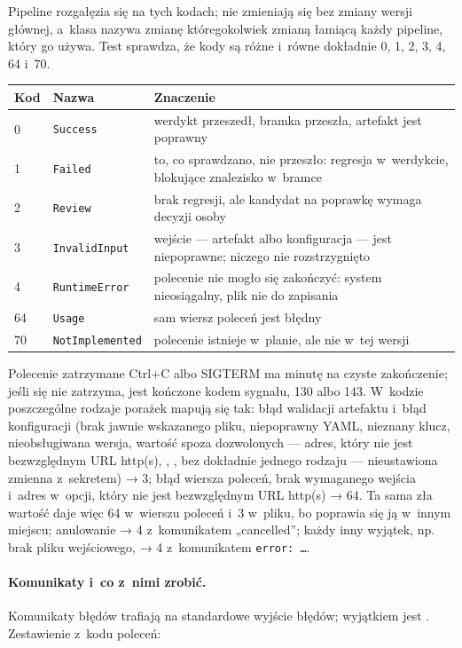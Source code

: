 Pipeline rozgałęzia się na tych kodach; nie zmieniają się bez zmiany wersji głównej, a~klasa
 nazywa zmianę któregokolwiek zmianą łamiącą każdy pipeline, który go
używa. Test sprawdza, że kody są różne i~równe dokładnie 0, 1, 2, 3, 4, 64 i~70.

{\small
\begin{tabularx}{\linewidth}{@{}l l >{\raggedright\arraybackslash}X@{}}
\toprule
Kod & Nazwa & Znaczenie \\
\midrule
0 & \texttt{Success} & werdykt przeszedł, bramka przeszła, artefakt jest poprawny \\
1 & \texttt{Failed} & to, co sprawdzano, nie przeszło: regresja w~werdykcie, blokujące
znalezisko w~bramce \\
2 & \texttt{Review} & brak regresji, ale kandydat na poprawkę wymaga decyzji osoby \\
3 & \texttt{InvalidInput} & wejście --- artefakt albo konfiguracja --- jest niepoprawne;
niczego nie rozstrzygnięto \\
4 & \texttt{RuntimeError} & polecenie nie mogło się zakończyć: system nieosiągalny, plik nie
do zapisania \\
64 & \texttt{Usage} & sam wiersz poleceń jest błędny \\
70 & \texttt{NotImplemented} & polecenie istnieje w~planie, ale nie w~tej wersji \\
\bottomrule
\end{tabularx}
}

Polecenie zatrzymane Ctrl+C albo SIGTERM ma minutę na czyste zakończenie; jeśli się nie
zatrzyma, jest kończone kodem sygnału, 130 albo 143. W~kodzie poszczególne rodzaje porażek
mapują się tak: błąd walidacji artefaktu i~błąd konfiguracji (brak jawnie wskazanego pliku,
niepoprawny YAML, nieznany klucz, nieobsługiwana wersja, wartość spoza dozwolonych ---
adres, który nie jest bezwzględnym URL http(s), , ,
 bez dokładnie jednego rodzaju --- nieustawiona zmienna z~sekretem) → 3;
błąd wiersza poleceń, brak wymaganego wejścia i~adres w~opcji, który nie jest bezwzględnym
URL http(s) → 64. Ta sama zła wartość daje więc 64 w~wierszu poleceń i~3 w~pliku, bo
poprawia się ją w~innym miejscu; anulowanie → 4 z~komunikatem „cancelled”; każdy inny wyjątek, np. brak
pliku wejściowego, → 4 z~komunikatem \texttt{error: …}.

\paragraph{Komunikaty i~co z~nimi zrobić.} Komunikaty błędów trafiają na standardowe
wyjście błędów; wyjątkiem jest . Zestawienie z~kodu poleceń:

